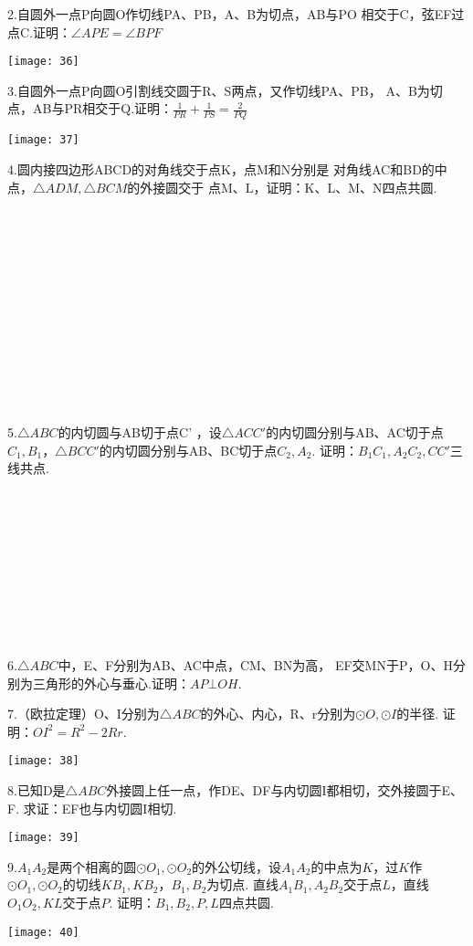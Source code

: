 2.自圆外一点P向圆O作切线PA、PB，A、B为切点，AB与PO
相交于C，弦EF过点C.证明：$\angle{APE}=\angle{BPF}$
\begin{center}
    \texttt{[image: 36]}
\end{center}

3.自圆外一点P向圆O引割线交圆于R、S两点，又作切线PA、PB，
A、B为切点，AB与PR相交于Q.证明：$\frac{1}{PR}+\frac{1}{PS}=\frac{2}{PQ}$
\begin{center}
    \texttt{[image: 37]}
\end{center}
\newpage
4.圆内接四边形ABCD的对角线交于点K，点M和N分别是
对角线AC和BD的中点，$\bigtriangleup ADM,\bigtriangleup BCM$的外接圆交于
点M、L，证明：K、L、M、N四点共圆.

~\\
~\\
~\\
~\\
~\\
~\\
~\\
~\\
~\\
~\\
~\\
~\\

5.$\bigtriangleup ABC$的内切圆与AB切于点C'
，设$\bigtriangleup ACC'$的内切圆分别与AB、AC切于点
$C_1,B_1$，$\bigtriangleup BCC'$的内切圆分别与AB、BC切于点$C_2,A_2$.
证明：$B_1C_1,A_2C_2,CC'$三线共点.
~\\
~\\
~\\
~\\
~\\
~\\
~\\
~\\
~\\
~\\
~\\

6.$\bigtriangleup ABC$中，E、F分别为AB、AC中点，CM、BN为高，
EF交MN于P，O、H分别为三角形的外心与垂心.证明：$AP\bot OH$.
\newpage

7.（欧拉定理）O、I分别为$\bigtriangleup ABC$的外心、内心，R、r分别为$\odot O,\odot I$的半径.
证明：$OI^2=R^2-2Rr$.
\begin{center}
    \texttt{[image: 38]}
\end{center}

8.已知D是$\bigtriangleup ABC$外接圆上任一点，作DE、DF与内切圆I都相切，交外接圆于E、F.
求证：EF也与内切圆I相切.
\begin{center}
    \texttt{[image: 39]}
\end{center}

9.$A_1A_2$是两个相离的圆$\odot O_1,\odot O_2$的外公切线，设$A_1A_2$的中点为$K$，过$K$作
$\odot O_1 ,\odot O_2$的切线$KB_1,KB_2$，$B_1,B_2$为切点.
直线$A_1B_1,A_2B_2$交于点$L$，直线$O_1O_2,KL$交于点$P$.
证明：$B_1,B_2,P,L$四点共圆.
\begin{center}
    \texttt{[image: 40]}
\end{center}